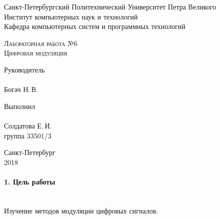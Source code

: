 \documentclass[12pt,a4paper]{report}
\begin{document}
\begin{titlepage}
\newpage
  \begin{center}
     
    Санкт-Петербургский Политехнический Университет Петра Великого \\
    
    Институт компьютерных наук и технологий \\
    
    Кафедра компьютерных систем и программных технологий
    \end{center}
    
    \vspace{15em}
    \begin{center}
    \textsc{Лабораторная работа №6}\\
    \vspace{5mm}
    \textsc{Цифровая модуляция}
    	
   \end{center}
\vspace{10em}

\newlength{\ML}
\hfill\begin{minipage}{0.45\textwidth}
\vfill
  Руководитель \\
  \\
  \underline{\hspace{\ML}} Богач Н.\,В.\\
 
\end{minipage}%
\bigskip

\hfill\begin{minipage}{0.45\textwidth}
  Выполнил\\
  \\
  \underline{\hspace{\ML}} Солдатова Е.\,И.\\
  группа 33501/3
\end{minipage}%

\vspace{\fill}
\begin{center}
    
  Санкт-Петербург\\
   2018 
\end{center}
\end{titlepage}

\paragraph{1. Цель работы\\\\}
Изучение методов модуляции цифровых сигналов.
\end{document}
